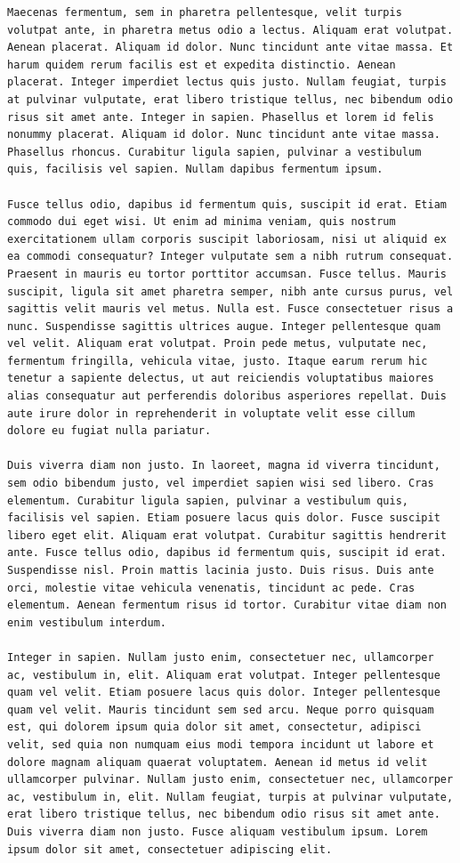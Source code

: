 \documentclass[a4paper, 12pt]{article}
\begin{document}
\begin{verbatim}
Maecenas fermentum, sem in pharetra pellentesque, velit turpis volutpat ante, in pharetra metus odio a lectus. Aliquam erat volutpat. Aenean placerat. Aliquam id dolor. Nunc tincidunt ante vitae massa. Et harum quidem rerum facilis est et expedita distinctio. Aenean placerat. Integer imperdiet lectus quis justo. Nullam feugiat, turpis at pulvinar vulputate, erat libero tristique tellus, nec bibendum odio risus sit amet ante. Integer in sapien. Phasellus et lorem id felis nonummy placerat. Aliquam id dolor. Nunc tincidunt ante vitae massa. Phasellus rhoncus. Curabitur ligula sapien, pulvinar a vestibulum quis, facilisis vel sapien. Nullam dapibus fermentum ipsum.

Fusce tellus odio, dapibus id fermentum quis, suscipit id erat. Etiam commodo dui eget wisi. Ut enim ad minima veniam, quis nostrum exercitationem ullam corporis suscipit laboriosam, nisi ut aliquid ex ea commodi consequatur? Integer vulputate sem a nibh rutrum consequat. Praesent in mauris eu tortor porttitor accumsan. Fusce tellus. Mauris suscipit, ligula sit amet pharetra semper, nibh ante cursus purus, vel sagittis velit mauris vel metus. Nulla est. Fusce consectetuer risus a nunc. Suspendisse sagittis ultrices augue. Integer pellentesque quam vel velit. Aliquam erat volutpat. Proin pede metus, vulputate nec, fermentum fringilla, vehicula vitae, justo. Itaque earum rerum hic tenetur a sapiente delectus, ut aut reiciendis voluptatibus maiores alias consequatur aut perferendis doloribus asperiores repellat. Duis aute irure dolor in reprehenderit in voluptate velit esse cillum dolore eu fugiat nulla pariatur.

Duis viverra diam non justo. In laoreet, magna id viverra tincidunt, sem odio bibendum justo, vel imperdiet sapien wisi sed libero. Cras elementum. Curabitur ligula sapien, pulvinar a vestibulum quis, facilisis vel sapien. Etiam posuere lacus quis dolor. Fusce suscipit libero eget elit. Aliquam erat volutpat. Curabitur sagittis hendrerit ante. Fusce tellus odio, dapibus id fermentum quis, suscipit id erat. Suspendisse nisl. Proin mattis lacinia justo. Duis risus. Duis ante orci, molestie vitae vehicula venenatis, tincidunt ac pede. Cras elementum. Aenean fermentum risus id tortor. Curabitur vitae diam non enim vestibulum interdum.

Integer in sapien. Nullam justo enim, consectetuer nec, ullamcorper ac, vestibulum in, elit. Aliquam erat volutpat. Integer pellentesque quam vel velit. Etiam posuere lacus quis dolor. Integer pellentesque quam vel velit. Mauris tincidunt sem sed arcu. Neque porro quisquam est, qui dolorem ipsum quia dolor sit amet, consectetur, adipisci velit, sed quia non numquam eius modi tempora incidunt ut labore et dolore magnam aliquam quaerat voluptatem. Aenean id metus id velit ullamcorper pulvinar. Nullam justo enim, consectetuer nec, ullamcorper ac, vestibulum in, elit. Nullam feugiat, turpis at pulvinar vulputate, erat libero tristique tellus, nec bibendum odio risus sit amet ante. Duis viverra diam non justo. Fusce aliquam vestibulum ipsum. Lorem ipsum dolor sit amet, consectetuer adipiscing elit.


\end{verbatim}
\end{document}
